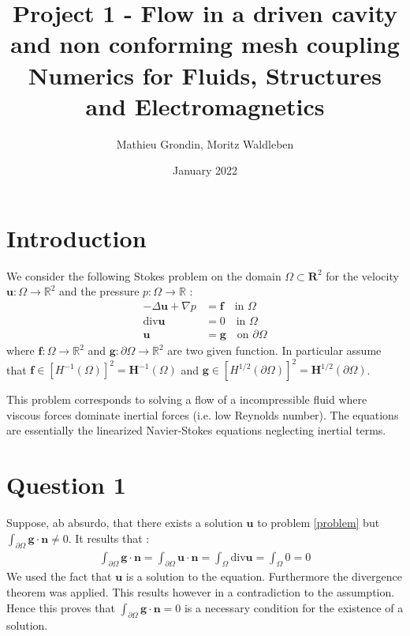 \documentclass{article}
\title{%
  Project 1 - Flow in a driven cavity and non conforming mesh coupling \\
  \bigskip
  \large Numerics for Fluids, Structures and Electromagnetics}
\author{Mathieu Grondin, Moritz Waldleben}
\date{January 2022}
\begin{document}
\maketitle

\section*{Introduction}
We consider the following Stokes problem on the domain $\Omega \subset
\mathbf{R}^2$ for the velocity $\mathbf{u} : \Omega \rightarrow \mathbb{R}^2$
and the pressure $p:\Omega \rightarrow \mathbb{R}$ :
\begin{align}
    \label{problem}
    -\Delta \mathbf{u} + \nabla p &= \mathbf{f}  \quad\textrm{in } \Omega\nonumber\\ 
    \textrm{div} \mathbf{u} &= 0 \quad \textrm{in } \Omega \\
    \mathbf{u} &= \mathbf{g} \quad \textrm{on } \partial \Omega  \nonumber
\end{align}
where $\mathbf{f} : \Omega \rightarrow \mathbb{R}^2$ and $\mathbf{g} :
\partial\Omega\rightarrow\mathbb{R}^2$ are two given function. In particular
assume that $\mathbf{f} \in [H^{-1}(\Omega)]^2=\mathbf{H}^{-1}(\Omega)$ and
$\mathbf{g} \in [H^{1/2}(\partial\Omega)]^2=\mathbf{H}^{1/2}(\partial\Omega)$.

This problem corresponds to solving a flow of a incompressible fluid where
viscous forces dominate inertial forces (i.e. low Reynolds number). The
equations are essentially the linearized Navier-Stokes equations neglecting
inertial terms. 

\section{Question 1}
Suppose, ab absurdo, that there exists a solution $\mathbf{u}$ to problem \ref{problem} but \\
$\int_{\partial\Omega}\mathbf{g}\cdot\mathbf{n} \neq 0$. It results that : 
\begin{align*}
    \int_{\partial\Omega}\mathbf{g}\cdot\mathbf{n} = \int_{\partial\Omega}\mathbf{u}\cdot \mathbf{n} = \int_{\Omega}\textrm{div}\mathbf{u}=\int_{\Omega}0=0 
\end{align*}
We used the fact that $\mathbf{u}$ is a solution to the equation. Furthermore
the divergence theorem was applied. This results however in a contradiction to
the assumption. Hence this proves that  $\int_{\partial\Omega}
\mathbf{g}\cdot\mathbf{n}=0$ is a necessary condition for the existence of a
solution.
\end{document}
